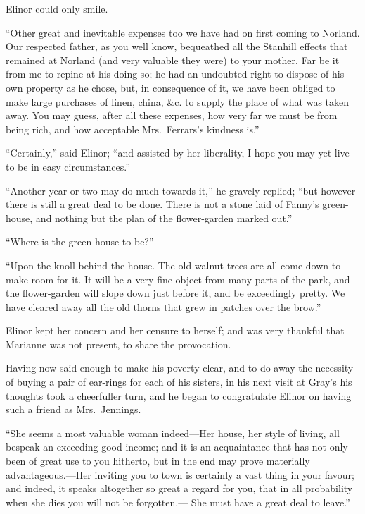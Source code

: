 \documentclass{article}
\begin{document}
Elinor could only smile.

``Other great and inevitable expenses too we have
had on first coming to Norland.  Our respected father,
as you well know, bequeathed all the Stanhill effects
that remained at Norland (and very valuable they were)
to your mother.  Far be it from me to repine at his
doing so; he had an undoubted right to dispose of his
own property as he chose, but, in consequence of it,
we have been obliged to make large purchases of linen,
china, \&c. to supply the place of what was taken away.
You may guess, after all these expenses, how very far we
must be from being rich, and how acceptable Mrs.\ Ferrars's
kindness is.''

``Certainly,'' said Elinor; ``and assisted by her liberality,
I hope you may yet live to be in easy circumstances.''

``Another year or two may do much towards it,''
he gravely replied; ``but however there is still a great
deal to be done.  There is not a stone laid of Fanny's
green-house, and nothing but the plan of the flower-garden
marked out.''

``Where is the green-house to be?''

``Upon the knoll behind the house.  The old
walnut trees are all come down to make room for it.
It will be a very fine object from many parts of the park,
and the flower-garden will slope down just before it,
and be exceedingly pretty.  We have cleared away all the old
thorns that grew in patches over the brow.''

Elinor kept her concern and her censure to herself;
and was very thankful that Marianne was not present,
to share the provocation.

Having now said enough to make his poverty clear,
and to do away the necessity of buying a pair of ear-rings
for each of his sisters, in his next visit at Gray's
his thoughts took a cheerfuller turn, and he began to
congratulate Elinor on having such a friend as Mrs.\ Jennings.

``She seems a most valuable woman indeed---Her house,
her style of living, all bespeak an exceeding good income;
and it is an acquaintance that has not only been
of great use to you hitherto, but in the end may prove
materially advantageous.---Her inviting you to town is
certainly a vast thing in your favour; and indeed, it
speaks altogether so great a regard for you, that in all
probability when she dies you will not be forgotten.---%
She must have a great deal to leave.''
\end{document}
